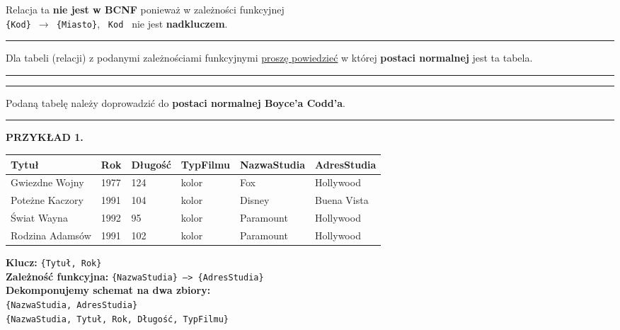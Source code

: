 \documentclass[a5paper,6pt]{article}
\newcommand{\horrule}[1]{\rule{\linewidth}{#1}}
\begin{document}
    Relacja ta \textbf{nie jest w BCNF} ponieważ w zależności funkcyjnej\\
    \texttt{\{Kod\} $\rightarrow$ \{Miasto\}}, \texttt{ Kod } nie jest
    \textbf{nadkluczem}.

\pagebreak

    \horrule{0.5pt}
    Dla tabeli (relacji) z podanymi zależnościami funkcyjnymi \underline{proszę
     powiedzieć} w której \textbf{postaci normalnej} jest ta tabela.\\
    \horrule{0.5pt}

\pagebreak

    \horrule{0.5pt}
    Podaną tabelę należy doprowadzić do
    \textbf{postaci normalnej Boyce’a Codd’a}.\\
    \horrule{0.5pt}

    \textbf{PRZYKŁAD 1.}

    \vskip 0.5cm

\begin{adjustbox}{width=\columnwidth,center}
    \begin{tabular}{|l|l|l|l|l|l|}
        \hline
        \textbf{Tytuł} &
        \textbf{Rok} &
        \textbf{Długość} &
        \textbf{TypFilmu} &
        \textbf{NazwaStudia} &
        \textbf{AdresStudia}\\
        \hline
        Gwiezdne Wojny &
        1977 &
        124 &
        kolor &
        Fox &
        Hollywood \\
        \hline
        Poteżne Kaczory &
        1991 &
        104 &
        kolor &
        Disney &
        Buena Vista \\
        \hline
        Świat Wayna &
        1992 &
        95 &
        kolor &
        Paramount &
        Hollywood \\
        \hline
        Rodzina Adamsów &
        1991 &
        102 &
        kolor &
        Paramount &
        Hollywood \\
        \hline
        \end{tabular}
\end{adjustbox}

    \vskip 0.5cm

    \textbf{Klucz:} \texttt{\{Tytuł, Rok\}}\\
    \textbf{Zależność funkcyjna:} \texttt{\{NazwaStudia\} --> \{AdresStudia\}}\\

    \textbf{Dekomponujemy schemat na dwa zbiory:}\\
    \texttt{\{NazwaStudia, AdresStudia\}}\\
    \texttt{\{NazwaStudia, Tytuł, Rok, Długość, TypFilmu\}}\\
\end{document}
